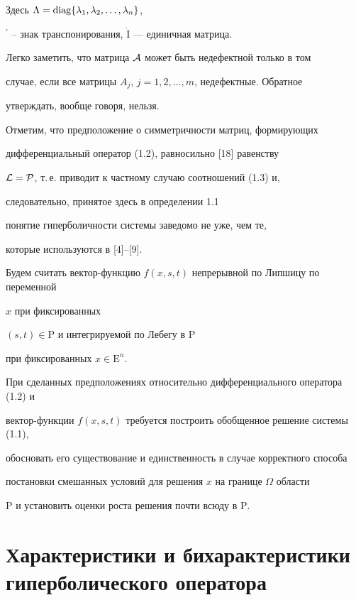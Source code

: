Здесь $\Lambda=\operatorname{diag} \{ \lambda_1, \lambda_2,\dotsc, \lambda_n\}$, 


$^\prime$ -- знак транспонирования, $\Dot{\mathrm I}$ --- единичная матрица.





Легко заметить, что матрица ${\cal A}$ может быть недефектной только в том 


случае, если все матрицы $A_{j}$, $j=1,2,\dotsc,m$, недефектные. Обратное 


утверждать, вообще говоря, нельзя.


Отметим, что предположение о симметричности матриц, формирующих 


дифференциальный оператор (1.2), равносильно [18] равенству 


${\cal L}={\cal P}$, т.\,е. приводит к частному случаю соотношений (1.3) и, 


следовательно, принятое здесь в определении 1.1


понятие гиперболичности системы заведомо не уже, чем те, 


которые используются в [4]--[9]. 





Будем считать вектор-функцию $f(x,s,t)$ непрерывной по Липшицу по переменной 


$x$ при фиксированных


$(s,t) \in {\mathrm P}$ и интегрируемой по Лебегу в $\mathrm P$ 


при фиксированных $x \in {\mathrm E}^n$.





При сделанных предположениях относительно дифференциального оператора (1.2) и


вектор-функции $f(x,s,t)$ требуется построить обобщенное решение системы (1.1),


обосновать его существование и единственность в случае корректного способа 


постановки смешанных условий для решения $x$ на границе $\Omega$ области


$\mathrm P$ и установить оценки роста решения почти всюду в $\mathrm P$.





\section{Характеристики и бихарактеристики гиперболического оператора}





